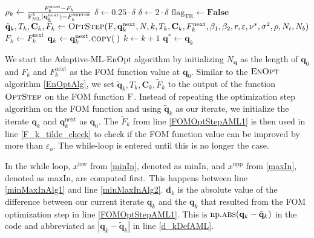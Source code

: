 \begin{algorithm}[H]
\begin{algorithmic}[1]
\State\label{rhoKDef} $\rho_k\gets \frac{F^\mathrm{next}_k-F_k}{\Call{F$_\mathrm{ML}^k$}{\mathbf{q}^\mathrm{next}_k}-F^\mathrm{approx}_k}$
\State $\delta\gets0.25\cdot\delta$
\Else
{}
\State $\delta\gets2\cdot\delta$
\EndIf
\EndIf
{}
\State $\mathrm{flag}_\mathrm{TR}\gets\mathbf{False}$
\EndIf
\EndWhile
\EndWhile
\State\label{FOMOptStepAML2} $\tilde{\mathbf{q}}_k,T_k,\mathbf{C}_k,\tilde{F}_k\gets\Call{OptStep}{\textproc{F},\mathbf{q}^\mathrm{next}_k,N,k,T_k,\mathbf{C}_k, F^\mathrm{next}_k, \beta_1, \beta_2, r, \varepsilon ,\nu^*, \sigma^2, \rho, N_t, N_b}$
\State $F_k \gets F^\mathrm{next}_k$
\State $\mathbf{q}_k \gets \mathbf{q}^\mathrm{next}_k\Call{.copy}{\:}$
\State $k\gets k+1$
\EndWhile
\State \Return $\mathbf{q}^*\gets\mathbf{q}_k$
\EndFunction
\end{algorithmic}
\end{algorithm}

We start the Adaptive-ML-EnOpt algorithm by initializing $N_\mathbf{q}$ as the length of ${\mathbf{q}_0}$ and $F_k$ and $F^\mathrm{next}_k$ as the FOM function value at $\mathbf{q}_0$. Similar to the $\textproc{EnOpt}$ algorithm \ref{EnOptAlg}, we set $\tilde{\mathbf{q}}_k,T_k,\mathbf{C}_k,\tilde{F}_k$ to the output of the function $\textproc{OptStep}$ on the FOM function $\textproc{F}$. Instead of repeating the optimization step algorithm on the FOM function and using $\tilde{\mathbf{q}}_k$ as our iterate, we initialize the iterate $\mathbf{q}_k$ and $\mathbf{q}^\mathrm{next}_k$ as $\mathbf{q}_0$. The $\tilde{F}_k$ from line \ref{FOMOptStepAML1} is then used in line \ref{F_k_tilde_check} to check if the FOM function value can be improved by more than $\varepsilon_o$. The while-loop is entered until this is no longer the case.

In the while loop, $x^\mathrm{low}$ from \eqref{minIn}, denoted as $\mathrm{minIn}$, and $x^\mathrm{upp}$ from \eqref{maxIn}, denoted as $\mathrm{maxIn}$, are computed first. This happens between line \ref{minMaxInAlg1} and line \ref{minMaxInAlg2}. $\mathbf{d}_k$ is the absolute value of the difference between our current iterate $\mathbf{q}_k$ and the $\mathbf{q}_k$ that resulted from the FOM optimization step in line \ref{FOMOptStepAML1}. This is $\mathrm{np.}\Call{abs}{\mathbf{q}_k-\tilde{\mathbf{q}}_k}$ in the code and abbreviated as $|\mathbf{q}_k-\tilde{\mathbf{q}}_k|$ in line \ref{d_kDefAML}.

